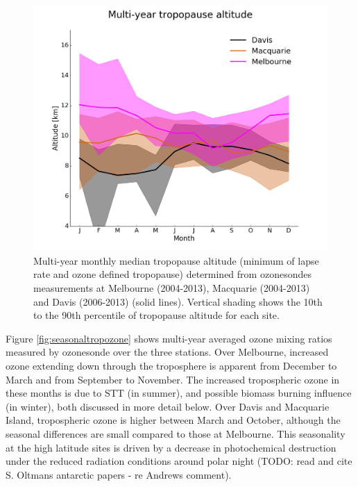 \documentclass{article}
\begin{document}
    \begin{figure}[!htbp] \begin{center}
      \includegraphics[width=0.8\columnwidth]{figures/tpheights}
      \caption{Multi-year monthly median tropopause altitude (minimum of lapse rate and ozone defined tropopause) determined from ozonesondes measurements at Melbourne (2004-2013), Macquarie (2004-2013) and Davis (2006-2013) (solid lines).
      Vertical shading shows the 10th to the 90th percentile of tropopause altitude for each site.
      }
      \label{fig:seasonaltpheights}
    \end{center} \end{figure}

    Figure \ref{fig:seasonaltropozone} shows multi-year averaged ozone mixing ratios measured by ozonesonde over the three stations.
    Over Melbourne, increased ozone extending down through the troposphere is apparent from December to March and from September to November.
    The increased tropospheric ozone in these months is due to STT (in summer), and possible biomass burning influence (in winter), both discussed in more detail below.
    Over Davis and Macquarie Island, tropospheric ozone is higher between March and October, although the seasonal differences are small compared to those at Melbourne.
    This seasonality at the high latitude sites is driven by a decrease in photochemical destruction under the reduced radiation conditions around polar night (TODO: read and cite S. Oltmans antarctic papers - re Andrews comment).
    
\end{document}
